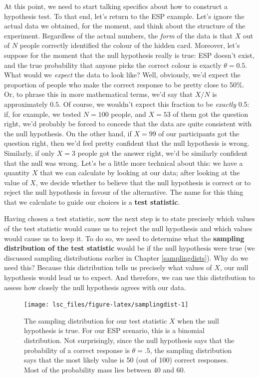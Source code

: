\documentclass[
  11pt,
  a4paper,
  twoside,symmetric,openright]{book}
\theoremstyle{break}
\theoremstyle{break}
\begin{document}
At this point, we need to start talking specifics about how to construct a hypothesis test. To that end, let's return to the ESP example. Let's ignore the actual data we obtained, for the moment, and think about the structure of the experiment. Regardless of the actual numbers, the \emph{form} of the data is that \(X\) out of \(N\) people correctly identified the colour of the hidden card. Moreover, let's suppose for the moment that the null hypothesis really is true: ESP doesn't exist, and the true probability that anyone picks the correct colour is exactly \(\theta = 0.5\). What would we \emph{expect} the data to look like? Well, obviously, we'd expect the proportion of people who make the correct response to be pretty close to 50\%. Or, to phrase this in more mathematical terms, we'd say that \(X/N\) is approximately \(0.5\). Of course, we wouldn't expect this fraction to be \emph{exactly} 0.5: if, for example, we tested \(N=100\) people, and \(X = 53\) of them got the question right, we'd probably be forced to concede that the data are quite consistent with the null hypothesis. On the other hand, if \(X = 99\) of our participants got the question right, then we'd feel pretty confident that the null hypothesis is wrong. Similarly, if only \(X=3\) people got the answer right, we'd be similarly confident that the null was wrong. Let's be a little more technical about this: we have a quantity \(X\) that we can calculate by looking at our data; after looking at the value of \(X\), we decide whether to believe that the null hypothesis is correct or to reject the null hypothesis in favour of the alternative. The name for this thing that we calculate to guide our choices is a \textbf{test statistic}.

Having chosen a test statistic, now the next step is to state precisely which values of the test statistic would cause us to reject the null hypothesis and which values would cause us to keep it. To do so, we need to determine what the \textbf{sampling distribution of the test statistic} would be if the null hypothesis were true (we discussed sampling distributions earlier in Chapter \ref{samplingdists}). Why do we need this? Because this distribution tells us precisely what values of \(X\), our null hypothesis would lead us to expect. And therefore, we can use this distribution to assess how closely the null hypothesis agrees with our data.

\begin{figure}

{\centering \texttt{[image: lsc\_files/figure-latex/samplingdist-1]} 

}

\caption{The sampling distribution for our test statistic $X$ when the null hypothesis is true. For our ESP scenario, this is a binomial distribution. Not surprisingly, since the null hypothesis says that the probability of a correct response is $\theta = .5$, the sampling distribution says that the most likely value is 50 (out of 100) correct responses. Most of the probability mass lies between 40 and 60.}\label{fig:samplingdist}
\end{figure}
\end{document}
